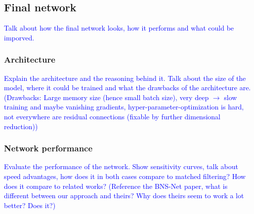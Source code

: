 \subsection{Final network}
\textcolor{blue}{Talk about how the final network looks, how it performs and what could be imporved.}
\subsubsection{Architecture}
\textcolor{blue}{Explain the architecture and the reasoning behind it. Talk about the size of the model, where it could be trained and what the drawbacks of the architecture are. (Drawbacks: Large memory size (hence small batch size), very deep $\to$ slow training and maybe vanishing gradients, hyper-parameter-optimization is hard, not everywhere are residual connections (fixable by further dimensional reduction))}
\subsubsection{Network performance}
\textcolor{blue}{Evaluate the performance of the network. Show sensitivity curves, talk about speed advantages, how does it in both cases compare to matched filtering? How does it compare to related works? (Reference the BNS-Net paper, what is different between our approach and theirs? Why does theirs seem to work a lot better? Does it?)}
